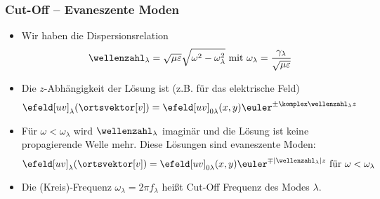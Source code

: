 \begin{frame}
  \frametitle{Cut-Off -- Evaneszente Moden}
  \begin{itemize}[<+->]
  \item Wir haben die \alert{Dispersionsrelation}
    \begin{equation*}
      \wellenzahl_\lambda=\sqrt{\mu\varepsilon}\sqrt{\omega^2-\omega_\lambda^2} \text{ mit } \omega_\lambda=\frac{\gamma_\lambda}{\sqrt{\mu\varepsilon}} 
    \end{equation*}
  \item Die \(z\)-Abhängigkeit der Lösung ist (z.B. für das elektrische Feld)
             \begin{equation*}
           \efeld[uv]_\lambda(\ortsvektor[v]) = \efeld[uv]_{0\lambda}(x,y) \euler^{\pm\komplex\wellenzahl_\lambda z}
         \end{equation*}
   \item Für \alert{\(\omega < \omega_\lambda\)} wird \(\wellenzahl_\lambda\) \alert{imaginär} und die Lösung ist \alert{keine propagierende Welle} mehr. Diese Lösungen sind \alert{evaneszente Moden}:
\begin{equation*}
           \efeld[uv]_\lambda(\ortsvektor[v]) = \efeld[uv]_{0\lambda}(x,y) \euler^{\mp|\wellenzahl_\lambda| z} \text{ für } \omega < \omega_\lambda
         \end{equation*}
         \item Die (Kreis)-Frequenz \(\omega_\lambda = 2\pi f_\lambda\) heißt \alert{Cut-Off Frequenz} des Modes \(\lambda\). 
 \end{itemize}
\end{frame}


